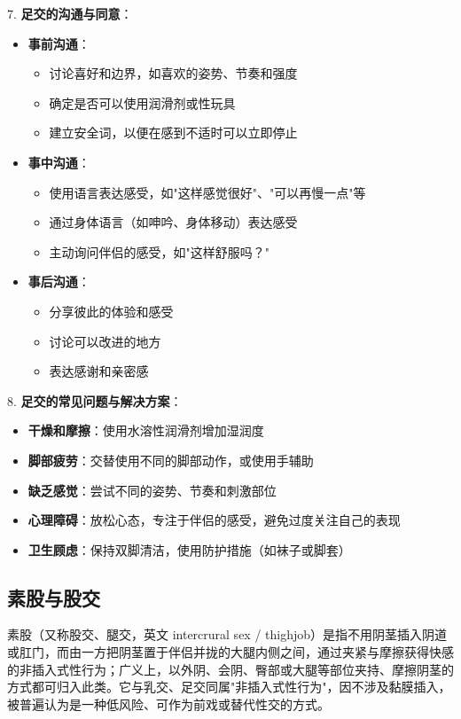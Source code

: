 \documentclass[12pt,UTF8]{ctexbook}
\begin{document}
7. \textbf{足交的沟通与同意}：
\begin{itemize}
	\item \textbf{事前沟通}：
	\begin{itemize}
		\item 讨论喜好和边界，如喜欢的姿势、节奏和强度
		\item 确定是否可以使用润滑剂或性玩具
		\item 建立安全词，以便在感到不适时可以立即停止
	\end{itemize}
	\item \textbf{事中沟通}：
	\begin{itemize}
		\item 使用语言表达感受，如"这样感觉很好"、"可以再慢一点"等
		\item 通过身体语言（如呻吟、身体移动）表达感受
		\item 主动询问伴侣的感受，如"这样舒服吗？"
	\end{itemize}
	\item \textbf{事后沟通}：
	\begin{itemize}
		\item 分享彼此的体验和感受
		\item 讨论可以改进的地方
		\item 表达感谢和亲密感
	\end{itemize}
\end{itemize}

8. \textbf{足交的常见问题与解决方案}：
\begin{itemize}
	\item \textbf{干燥和摩擦}：使用水溶性润滑剂增加湿润度
	\item \textbf{脚部疲劳}：交替使用不同的脚部动作，或使用手辅助
	\item \textbf{缺乏感觉}：尝试不同的姿势、节奏和刺激部位
	\item \textbf{心理障碍}：放松心态，专注于伴侣的感受，避免过度关注自己的表现
	\item \textbf{卫生顾虑}：保持双脚清洁，使用防护措施（如袜子或脚套）
\end{itemize}

\subsection{素股与股交}

素股（又称股交、腿交，英文 intercrural sex / thighjob）是指不用阴茎插入阴道或肛门，而由一方把阴茎置于伴侣并拢的大腿内侧之间，通过夹紧与摩擦获得快感的非插入式性行为；广义上，以外阴、会阴、臀部或大腿等部位夹持、摩擦阴茎的方式都可归入此类。它与乳交、足交同属"非插入式性行为"，因不涉及黏膜插入，被普遍认为是一种低风险、可作为前戏或替代性交的方式。
\end{document}
